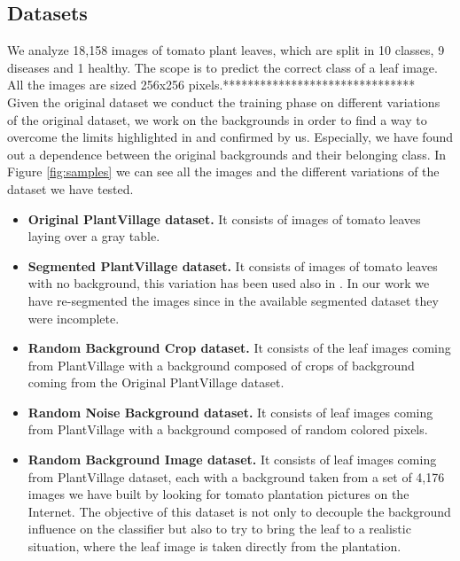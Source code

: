 \subsection{Datasets}
We analyze 18,158 images of tomato plant leaves, which are split in 10 classes, 9 diseases and 1 healthy. The scope is to predict the correct class of a leaf image. All the images are sized 256x256 pixels.*******************************
\\\indent
Given the original dataset we conduct the training phase on different variations of the original dataset, we work on the backgrounds in order to find a way to overcome the limits highlighted in \cite{ref33, ref10} and confirmed by us. Especially, we have found out a dependence between the original backgrounds and their belonging class.
In Figure \ref{fig:samples} we can see all the images and the different variations of the dataset we have tested.
\begin{itemize}
	\item{\textbf{Original PlantVillage dataset.} It consists of images of tomato leaves laying over a gray table.}
	\vspace{-5pt}
	\item{\textbf{Segmented PlantVillage dataset.} It consists of images of tomato leaves with no background, this variation has been used also in \cite{ref10}. In our work we have re-segmented the images since in the available segmented dataset they were incomplete.}
	\vspace{-5pt}
	\item{\textbf{Random Background Crop dataset.} It consists of the leaf images coming from PlantVillage with a background composed of crops of background coming from the Original PlantVillage dataset.}
	\vspace{-5pt}
	\item{\textbf{Random Noise Background dataset.} It consists of leaf images coming from PlantVillage with a background composed of random colored pixels.}
	\vspace{-5pt}
	\item{\textbf{Random Background Image dataset.} It consists of leaf images coming from PlantVillage dataset, each with a background taken from a set of 4,176 images we have built by looking for tomato plantation pictures on the Internet. The objective of this dataset is not only to decouple the background influence on the classifier but also to try to bring the leaf to a realistic situation, where the leaf image is taken directly from the plantation.}
\end{itemize}
